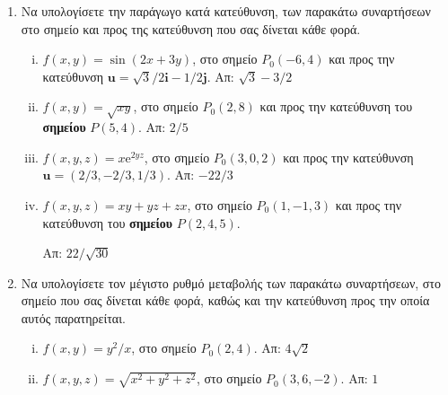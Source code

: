 



\pagestyle{askhseis}
\renewcommand{\vec}{\mathbf}

\linespread{1.3}



\begin{center}
  \minibox{\large \bfseries \textcolor{Col1}{Ασκήσεις στην Παράγωγο κατά Κατεύθυνση}}
\end{center}

\vspace{\baselineskip}

\begin{enumerate}
  \item Να υπολογίσετε την παράγωγο κατά κατεύθυνση, των παρακάτω συναρτήσεων στο σημείο 
    και προς της κατεύθυνση που σας δίνεται κάθε φορά.
    \begin{enumerate}[i)]
      \item $ f(x,y) = \sin{(2x+3y)} $, στο σημείο $ P_{0}(-6,4) $ και προς την
        κατεύθυνση  $ \mathbf{u} = \sqrt{3} /2 \mathbf{i} - 1/2 \mathbf{j}$. 
        \hfill Απ: $ \sqrt{3} - 3/2 $ 
      \item $ f(x,y) = \sqrt{xy} $, στο σημείο $ P_{0}(2,8) $ και προς την
        κατεύθυνση του \textbf{σημείου} $P(5,4) $. \hfill Απ: $ 2 / 5 $ 
      \item $ f(x,y,z) = x \mathrm{e}^{2yz} $, στο σημείο $ P_{0}(3,0,2) $ και προς την
        κατεύθυνση  $ \mathbf{u} = (2/3, -2/3 , 1/3) $. 
        \hfill Απ: $-22/3$ 
      \item $ f(x,y,z) = xy+yz+zx $, στο σημείο $ P_{0}(1,-1,3) $ και προς την
        κατεύθυνση  του \textbf{σημείου} $P(2,4,5)$. 

        \hfill Απ: $ 22/\sqrt{30} $
    \end{enumerate}

  \item Να υπολογίσετε τον μέγιστο ρυθμό μεταβολής των παρακάτω συναρτήσεων, στο σημείο 
    που σας δίνεται κάθε φορά, καθώς και την κατεύθυνση προς την οποία αυτός 
    παρατηρείται.
    \begin{enumerate}[i)]
      \item $ f(x,y) = y^{2}/x $, στο σημείο $ P_{0}(2,4) $.
        \hfill Απ: $4 \sqrt{2}$ 
      \item $ f(x,y,z) = \sqrt{x^{2}+y^{2}+z^{2}} $, στο σημείο $ P_{0}(3,6,-2) $.
        \hfill Απ: $ 1 $
    \end{enumerate}


\end{enumerate}
